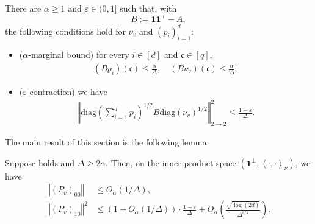 \documentclass[a4paper,12pt]{article}
\theoremstyle{plain}
\theoremstyle{definition}
\def\*#1{\mathbf{#1}} %
\def\-#1{\mathrm{#1}} %
\def\!#1{\mathfrak{#1}} %
\def\*#1{\boldsymbol{#1}} %
\def\-#1{\mathrm{#1}} %
\def\!#1{\mathfrak{#1}} %
\renewcommand{\epsilon}{\varepsilon}
\newcommand{\norm}[1]{\left\Vert#1\right\Vert}
\newcommand{\tuple}[1]{\left(#1\right)}
\newcommand{\inner}[2]{\left\langle #1,#2\right\rangle}
\newcommand{\tp}{\tuple}
\begin{document}
\begin{condition}\label{cond:alpha-eps-Delta-contraction}
  There are $\alpha \geq 1$ and $\epsilon \in (0,1]$ such that, with
  \[B := \*1\*1^\intercal - A,\]
  the following conditions hold for $\nu_v$ and $(p_i)_{i=1}^d$:
  \begin{itemize}
  \item ($\alpha$-marginal bound) for every $i\in[d]$ and
    $\!c\in[q]$,
    \begin{align*}
      (Bp_i)(\!c)\leq \frac{\alpha}{\Delta}, \quad (B\nu_v)(\!c)\leq \frac{\alpha}{\Delta};
    \end{align*}
  \item ($\epsilon$-contraction) we have
    \begin{align*}
      \norm{
      \-{diag}\tp{\sum_{i=1}^d p_i}^{1/2}
      B
      \-{diag}\tp{\nu_v}^{1/2}
      }_{2\to2}^2 \leq \frac{1-\epsilon}{\Delta}.
    \end{align*}
  \end{itemize}
\end{condition}

The main result of this section is the following lemma.

\begin{lemma}\label{lem:block-estimate-via-contraction}
  Suppose  holds and $\Delta\geq2\alpha$.
  Then, on the inner-product space $(\*1^\perp, \inner{\cdot}{\cdot}_{\nu})$, we have
  \begin{align}
    \label{eq:general-P00}
    \norm{(P_v)_{00}} &\leq O_{\alpha}\tp{1/\Delta}, \\
    \label{eq:general-P10}
    \norm{(P_v)_{10}}^2 &\leq \tp{1 + O_\alpha(1/\Delta)} \cdot \frac{1-\epsilon}{\Delta} + O_\alpha\tp{\frac{\sqrt{\log(2d)}}{\Delta^{3/2}}}.
  \end{align}
\end{lemma}
\end{document}
